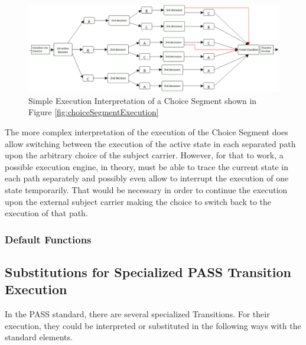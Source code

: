 \begin{figure}[htbp]
	\centering
	\includegraphics[width=0.9\linewidth]{Figures/Ontology/SubjectBehavior/ChoiceSegmentInterpretation.png}
	\caption[Simple Execution Interpretation of a Choice Segment shown in Figure \ref{fig:choiceSegmentExecution}]{Simple Execution Interpretation of a Choice Segment shown in Figure \ref{fig:choiceSegmentExecution}}
	\label{fig:choiceSegmentExecutionInterpretation}
\end{figure}

The more complex interpretation of the execution of the Choice Segment does allow switching between the execution of the active state in each separated path upon the arbitrary choice of the subject carrier. However, for that to work, a possible execution engine, in theory, must be able to trace the current state in each path separately and possibly even allow to interrupt the execution of one state temporarily. That would be necessary in order to continue the execution upon the external subject carrier making the choice to switch back to the execution of that path. 


\subsubsection{Default Functions}




\subsection{Substitutions for Specialized PASS Transition Execution}

In the PASS standard, there are several specialized Transitions. For their execution, they could be interpreted or substituted in the following ways with the standard elements. 

